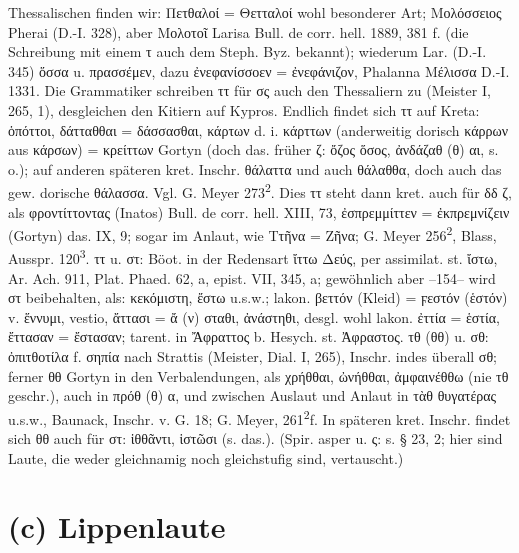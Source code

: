 Thessalischen finden wir: Πετθαλοί = Θετταλοί wohl besonderer Art; Μολόσσειος Pherai (D.-I. 328), aber Μολοτοῖ Larisa Bull. de corr. hell. 1889, 381 f. (die Schreibung mit einem τ auch dem Steph. Byz. bekannt); wiederum Lar. (D.-I. 345) ὅσσα u. πρασσέμεν, dazu ἐνεφανίσσοεν = ἐνεφάνιζον, Phalanna Μέλισσα D.-I. 1331. Die Grammatiker schreiben ττ für σς auch den Thessaliern zu (Meister I, 265, 1), desgleichen den Kitiern auf Kypros. Endlich findet sich ττ auf Kreta: ὁπόττοι, δάτταθθαι = δάσσασθαι, κάρτων d. i. κάρττων (anderweitig dorisch κάρρων aus κάρσων) = κρείττων Gortyn (doch das. früher ζ: ὄζος ὅσος, ἀνδάζαθ (θ) αι, s. o.); auf anderen späteren kret. Inschr. θάλαττα und auch θάλαθθα, doch auch das gew. dorische θάλασσα. Vgl. G. Meyer 273\textsuperscript{2}. Dies ττ steht dann kret. auch für δδ ζ, als φροντίττοντας (Inatos) Bull. de corr. hell. XIII, 73, ἐσπρεμμίττεν = ἐκπρεμνίζειν (Gortyn) das. IX, 9; sogar im Anlaut, wie Ττῆνα = Ζῆνα; G. Meyer 256\textsuperscript{2}, Blass, Ausspr. 120\textsuperscript{3}. ττ u. στ: Böot. in der Redensart ἴττω Δεύς, per assimilat. st. ἴστω, Ar. Ach. 911, Plat. Phaed. 62, a, epist. VII, 345, a; gewöhnlich aber --154-- wird στ beibehalten, als: κεκόμιστη, ἔστω u.s.w.; lakon. βεττόν (Kleid) = ϝεστόν (ἑστόν) v. ἕννυμι, vestio, ἄττασι = ἄ (ν) σταθι, ἀνάστηθι, desgl. wohl lakon. ἐττία = ἑστία, ἔττασαν = ἔστασαν; tarent. in Ἄφραττος b. Hesych. st. Ἀφραστος. τθ (θθ) u. σθ: ὀπιτθοτίλα f. σηπία  nach Strattis (Meister, Dial. I, 265), Inschr. indes überall σθ; ferner θθ Gortyn in den Verbalendungen, als χρήθθαι, ὠνήθθαι, ἀμφαινέθθω (nie τθ geschr.), auch in πρόθ (θ) α, und zwischen Auslaut und Anlaut in τὰθ θυγατέρας u.s.w., Baunack, Inschr. v. G. 18; G. Meyer, 261\textsuperscript{2}f. In späteren kret. Inschr. findet sich θθ auch für στ: ἱθθᾶντι, ἱστῶσι (s. das.). (Spir. asper u. ς: s. § 23, 2; hier sind Laute, die weder gleichnamig noch gleichstufig sind, vertauscht.)
\section{(c) Lippenlaute}


